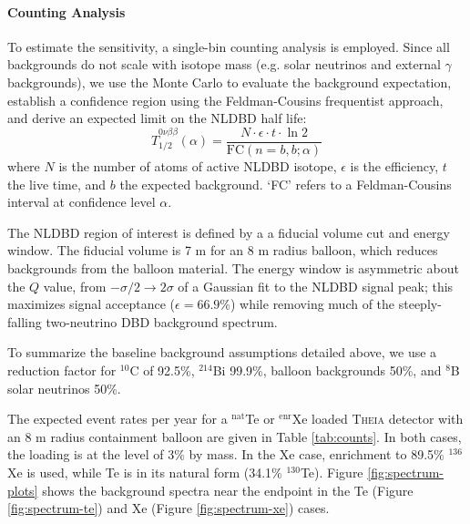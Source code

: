 \paragraph{Counting Analysis}
To estimate the sensitivity, a single-bin counting analysis is employed. Since
all backgrounds do not scale with isotope mass (e.g. solar neutrinos
and external $\gamma$ backgrounds), we use the Monte Carlo to evaluate the
background expectation, establish a confidence region using the Feldman-Cousins
frequentist approach, and derive an expected limit on the NLDBD half life:
\begin{equation}
\label{eq:sens}
\widehat{T}_{1/2}^{0\nu\beta\beta}(\alpha) = 
\frac{N\cdot \epsilon \cdot t \cdot \ln 2}{\mathrm{FC}(n=b, b; \alpha)}
\end{equation}
where $N$ is the number of atoms of active NLDBD isotope, $\epsilon$ is the
efficiency, $t$ the live time, and $b$ the expected background.
`FC' refers to a Feldman-Cousins interval at confidence level
$\alpha$.

The NLDBD region of interest is defined by a a fiducial volume cut and
energy window. The fiducial volume is 7 m for an 8 m radius balloon, which
reduces backgrounds from the balloon material. The energy window is asymmetric
about the $Q$ value, from $-\sigma/2 \to 2\sigma$ of a Gaussian fit to the
NLDBD signal peak; this maximizes signal acceptance ($\epsilon=66.9$\%)
while removing much of the steeply-falling two-neutrino DBD background
spectrum.

To summarize the baseline background assumptions detailed above,
we use a reduction
factor for $^{10}$C of 92.5\%, $^{214}$Bi 99.9\%, balloon backgrounds 50\%,
and $^8$B solar neutrinos 50\%.

The expected event rates per year for a $^\mathrm{nat}$Te or
$^\mathrm{enr}$Xe loaded \textsc{Theia}
detector with an 8 m radius containment balloon are given in Table
\ref{tab:counts}. In both cases, the loading is at the level of 3\% by mass.
In the Xe case, enrichment to 89.5\% $^{136}$Xe is used, while Te is in its
natural form (34.1\% $^{130}$Te). Figure \ref{fig:spectrum-plots} shows
the background spectra near the endpoint in the
Te (Figure \ref{fig:spectrum-te}) and Xe (Figure \ref{fig:spectrum-xe}) cases.

